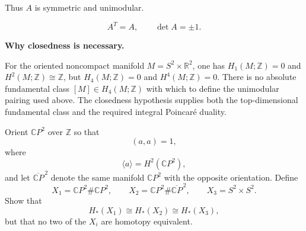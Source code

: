 \begin{solution}
Thus \(A\) is symmetric and unimodular.

\[
\boxed{A^T=A,\qquad \det A=\pm 1.}
\]

\medskip
\noindent\textbf{Why closedness is necessary.}\par\smallskip
For the oriented noncompact manifold
\(M=S^2\times\mathbb R^2\), one has \(H_1(M;\mathbb Z)=0\) and
\(H^2(M;\mathbb Z)\cong\mathbb Z\), but \(H_4(M;\mathbb Z)=0\)
and \(H^4(M;\mathbb Z)=0\).
There is no absolute fundamental class \([M]\in H_4(M;\mathbb Z)\)
with which to define the unimodular pairing used above. The closedness
hypothesis supplies both the top-dimensional fundamental class and the
required integral Poincar\'e duality.

\end{solution}

\begin{problem}
Orient \(\mathbb CP^2\) over \(\mathbb Z\) so that
\[
(a,a)=1,
\]
where
\[
\langle a\rangle=H^2(\mathbb CP^2),
\]
and let \(\overline{\mathbb CP}^{\,2}\) denote the same manifold \(\mathbb CP^2\) with
the opposite orientation. Define
\[
X_1=\mathbb CP^2\#\mathbb CP^2,
\qquad
X_2=\mathbb CP^2\#\overline{\mathbb CP}^{\,2},
\qquad
X_3=S^2\times S^2.
\]
Show that
\[
H_*(X_1)\cong H_*(X_2)\cong H_*(X_3),
\]
but that no two of the \(X_i\) are homotopy equivalent.

\par

\noindent
\end{problem}

